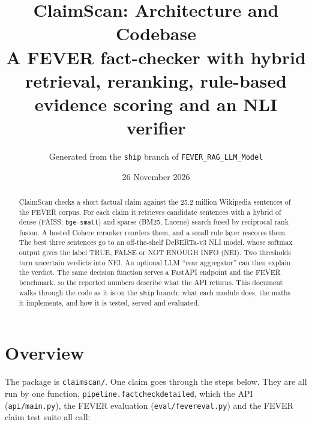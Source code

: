 \documentclass[11pt,a4paper]{article}
\title{ClaimScan: Architecture and Codebase\\[4pt]
\large A FEVER fact-checker with hybrid retrieval, reranking, rule-based evidence scoring and an NLI verifier}
\author{Generated from the \texttt{ship} branch of \texttt{FEVER\_RAG\_LLM\_Model}}
\date{26 November 2026}
\makeatletter
\DeclareRobustCommand{\_}{\ifmmode\nfss@text{\textunderscore}\else\textunderscore\allowbreak\fi}
\newcommand{\file}[1]{\texttt{#1}}
\newcommand{\NEI}{\textup{NEI}}
\makeatother
\begin{document}
\maketitle

\begin{abstract}
\noindent
ClaimScan checks a short factual claim against the 25.2 million Wikipedia sentences of the FEVER corpus.
For each claim it retrieves candidate sentences with a hybrid of dense (FAISS, \texttt{bge-small}) and sparse
(BM25, Lucene) search fused by reciprocal rank fusion. A hosted Cohere reranker reorders them, and a small
rule layer rescores them. The best three sentences go to an off-the-shelf DeBERTa-v3 NLI model, whose softmax
output gives the label TRUE, FALSE or NOT ENOUGH INFO (\NEI). Two thresholds turn uncertain verdicts into \NEI.
An optional LLM ``rear aggregator'' can then explain the verdict. The same decision function serves a FastAPI
endpoint and the FEVER benchmark, so the reported numbers describe what the API returns. This document walks through
the code as it is on the \texttt{ship} branch: what each module does, the maths it implements, and how it is
tested, served and evaluated.
\end{abstract}

\tableofcontents
\newpage

\section{Overview}

The package is \file{claimscan/}. One claim goes through the steps below. They are all run by one function,
\file{pipeline.fact\_check\_detailed}, which the API (\file{api/main.py}), the FEVER evaluation
(\file{eval/fever\_eval.py}) and the FEVER claim test suite all call:
\end{document}
